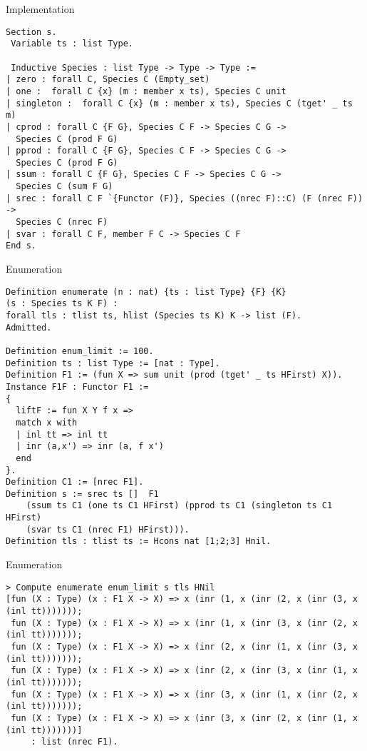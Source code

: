 \documentclass{beamer}
\begin{document}
\begin{frame}[fragile]{Implementation}
\begin{footnotesize}
\begin{verbatim}
Section s.
 Variable ts : list Type.

 Inductive Species : list Type -> Type -> Type := 
| zero : forall C, Species C (Empty_set)
| one :  forall C {x} (m : member x ts), Species C unit
| singleton :  forall C {x} (m : member x ts), Species C (tget' _ ts m)
| cprod : forall C {F G}, Species C F -> Species C G -> 
  Species C (prod F G)
| pprod : forall C {F G}, Species C F -> Species C G -> 
  Species C (prod F G)
| ssum : forall C {F G}, Species C F -> Species C G -> 
  Species C (sum F G)
| srec : forall C F `{Functor (F)}, Species ((nrec F)::C) (F (nrec F)) -> 
  Species C (nrec F) 
| svar : forall C F, member F C -> Species C F
End s.
\end{verbatim}
\end{footnotesize}
\end{frame}

\begin{frame}[fragile]{Enumeration}
\begin{scriptsize}
\begin{verbatim}
Definition enumerate (n : nat) {ts : list Type} {F} {K} 
(s : Species ts K F) : 
forall tls : tlist ts, hlist (Species ts K) K -> list (F).
Admitted.

Definition enum_limit := 100.
Definition ts : list Type := [nat : Type].
Definition F1 := (fun X => sum unit (prod (tget' _ ts HFirst) X)).
Instance F1F : Functor F1 := 
{
  liftF := fun X Y f x => 
  match x with 
  | inl tt => inl tt
  | inr (a,x') => inr (a, f x')
  end
}.
Definition C1 := [nrec F1].
Definition s := srec ts []  F1 
	(ssum ts C1 (one ts C1 HFirst) (pprod ts C1 (singleton ts C1 HFirst) 
	(svar ts C1 (nrec F1) HFirst))).
Definition tls : tlist ts := Hcons nat [1;2;3] Hnil.
\end{verbatim}
\end{scriptsize}
\end{frame}

\begin{frame}[fragile]{Enumeration}
\begin{scriptsize}
\begin{verbatim}
> Compute enumerate enum_limit s tls HNil
[fun (X : Type) (x : F1 X -> X) => x (inr (1, x (inr (2, x (inr (3, x (inl tt)))))));
 fun (X : Type) (x : F1 X -> X) => x (inr (1, x (inr (3, x (inr (2, x (inl tt)))))));
 fun (X : Type) (x : F1 X -> X) => x (inr (2, x (inr (1, x (inr (3, x (inl tt)))))));
 fun (X : Type) (x : F1 X -> X) => x (inr (2, x (inr (3, x (inr (1, x (inl tt)))))));
 fun (X : Type) (x : F1 X -> X) => x (inr (3, x (inr (1, x (inr (2, x (inl tt)))))));
 fun (X : Type) (x : F1 X -> X) => x (inr (3, x (inr (2, x (inr (1, x (inl tt)))))))]
	 : list (nrec F1).
\end{verbatim}
\end{scriptsize}
\end{frame}
\end{document}
